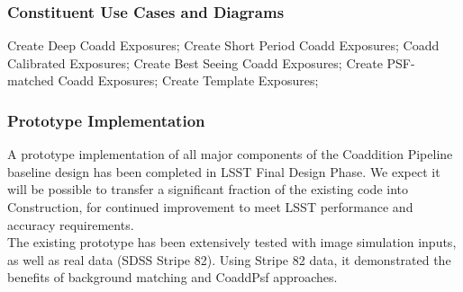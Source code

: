 \documentclass[12pt]{article}
\begin{document}

\subsubsection{Constituent Use Cases and Diagrams}

Create Deep Coadd Exposures; Create Short Period Coadd Exposures; Coadd Calibrated Exposures; Create Best Seeing Coadd Exposures; Create PSF-matched Coadd Exposures;
Create Template Exposures;

\subsubsection{Prototype Implementation}

A prototype implementation of all major components of the Coaddition Pipeline baseline design has been completed in LSST Final Design Phase. We expect it will be possible to transfer a significant fraction of the existing code into Construction, for continued improvement to meet LSST performance and accuracy requirements.
\\

The existing prototype has been extensively tested with image simulation inputs, as well as real data (SDSS Stripe 82). Using Stripe 82 data, it demonstrated the benefits of background matching and CoaddPsf approaches.
\\
\end{document}
